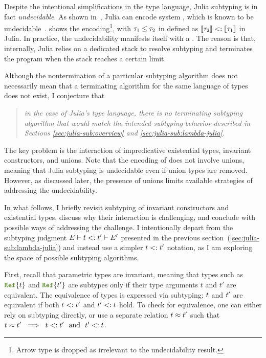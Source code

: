 Despite the intentional simplifications in the type language,
Julia subtyping is in fact \emph{undecidable}.
As shown in~\cite{bib:chung:type-julia-thesis:2023}, Julia can encode system
\FSubN, which is known to be undecidable~\cite{bib:pierce:bound-sub-undec:1992}.
 shows the encoding\footnote{Arrow %
type is dropped as irrelevant to the undecidability result.},
with $\tau_1 \leq \tau_2$ in \FSubN defined as
$\llbracket \tau_2 \rrbracket <: \llbracket \tau_1 \rrbracket$ in Julia.
In practice, the undecidability %
manifests itself with a .
The reason is that, internally, Julia relies on a dedicated stack
to resolve subtyping
and terminates the program when the stack reaches a certain limit.

Although the nontermination of a particular subtyping algorithm
does not necessarily mean that a terminating algorithm for the same
language of types does not exist, I {conjecture} that
\begin{quotation}\noindent\emph{%
  in the case of Julia's type language, there is no terminating subtyping
  algorithm that would match the intended subtyping behavior
  described in Sections \ref{sec:julia-sub:overview} and
  \ref{sec:julia-sub:lambda-julia}.
}\end{quotation}
The key problem is the interaction of
impredicative existential types, invariant constructors, and unions.
Note that the encoding of \FSubN does not involve unions, meaning that Julia
subtyping is undecidable even if union types are removed.
However, as discussed later, the presence of unions limits available strategies
of addressing the undecidability.

In what follows, I briefly revisit subtyping of invariant constructors
and existential types, discuss why their interaction is challenging,
and conclude with possible ways of addressing the challenge.
I intentionally depart from the subtyping judgment
$E \vdash t <: t' \vdash E'$
presented in the previous section~(\ref{sec:julia-sub:lambda-julia})
and instead use a simpler $t <: t'$ notation,
as I am exploring the space of possible subtyping algorithms.

First, recall that parametric types are invariant, meaning that
types such as $\reftyp{t}$ and $\reftyp{t'}$ are subtypes
only if their type arguments $t$ and $t'$ are equivalent.
The equivalence of types is expressed via subtyping:
$t$ and $t'$ are equivalent
if both $t <: t'$ and $t' <: t$ hold.
To check for equivalence, one can either rely on subtyping directly,
or use a separate relation $t \approx t'$ such that 
$\t \approx \t' \ \implies\ \t <: \t'\ \text{ and }\ \t' <: \t$.


